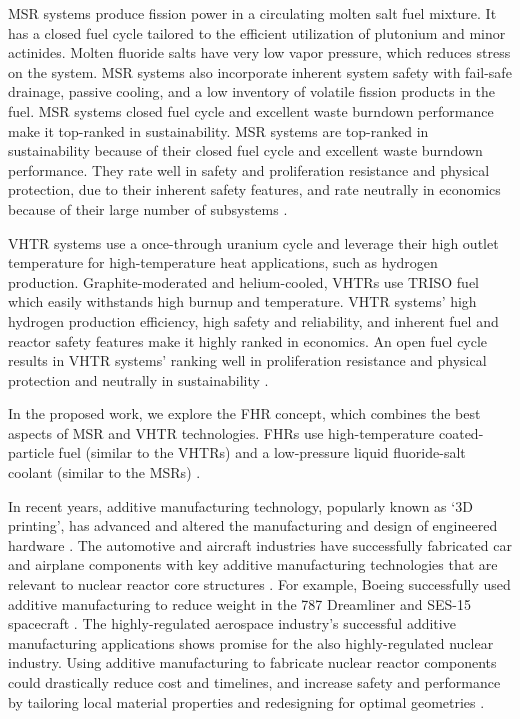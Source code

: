 \gls{MSR} systems produce fission power in a circulating molten salt fuel mixture. 
It has a closed fuel cycle tailored to the efficient utilization of plutonium 
and minor actinides. 
Molten fluoride salts have very low vapor pressure, which reduces stress on the 
system. 
MSR systems also incorporate inherent system safety with fail-safe drainage, 
passive cooling, and a low inventory of volatile fission products in the fuel. 
\gls{MSR} systems closed fuel cycle and excellent waste burndown performance 
make it top-ranked in sustainability. 
MSR systems are top-ranked in sustainability because of their closed fuel cycle 
and excellent waste burndown performance. 
They rate well in safety and proliferation resistance and physical protection, 
due to their inherent safety features, and rate neutrally in economics because of
their large number of subsystems \cite{gif_technology_2002}.  

\gls{VHTR} systems use a once-through uranium cycle and leverage their 
high outlet temperature for high-temperature heat applications, such as hydrogen 
production. 
Graphite-moderated and helium-cooled, \glspl{VHTR} use \gls{TRISO} fuel
which easily withstands high burnup and temperature.  
\gls{VHTR} systems' high hydrogen production efficiency, high safety and 
reliability, and inherent fuel and reactor safety features make it highly 
ranked in economics. 
An open fuel cycle results in \gls{VHTR} systems' ranking well in proliferation 
resistance and physical protection and neutrally in sustainability 
\cite{gif_technology_2002}. 

In the proposed work, we explore the \gls{FHR} concept, which 
combines the best aspects of \gls{MSR} and \gls{VHTR} technologies. 
\glspl{FHR} use high-temperature coated-particle fuel (similar to the \glspl{VHTR}) 
and a low-pressure liquid fluoride-salt coolant (similar to the \glspl{MSR})
\cite{forsberg_fluoride-salt-cooled_2012,facilitators_fluoride-salt-cooled_2013}.

In recent years, additive manufacturing technology, popularly known as `3D printing', 
has advanced and altered the manufacturing and design of engineered hardware
\cite{simpson_considerations_2019}. 
The automotive and aircraft industries have successfully fabricated car and 
airplane components with key additive manufacturing technologies that are 
relevant to nuclear reactor core structures \cite{murr_frontiers_2016}.  
For example, Boeing successfully used additive manufacturing to reduce weight 
in the 787 Dreamliner \cite{noauthor_printed_2017} and SES-15 spacecraft 
\cite{noauthor_boeing_nodate}. 
The highly-regulated aerospace industry's successful additive manufacturing 
applications shows promise for the also highly-regulated nuclear industry.  
Using additive manufacturing to fabricate nuclear reactor components could 
drastically reduce cost and timelines, and increase safety and performance by 
tailoring local material properties and redesigning for optimal geometries
\cite{simpson_considerations_2019}. 


